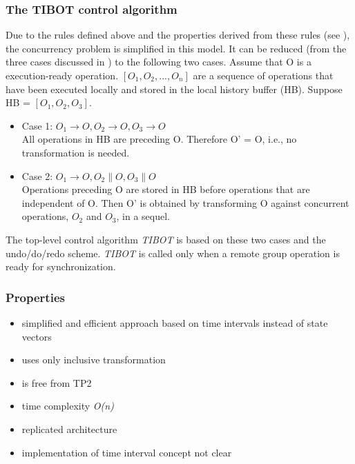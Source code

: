 \subsubsection{The TIBOT control algorithm}
Due to the rules defined above and the properties derived from these rules (see \cite{tibot}), the concurrency problem is simplified in this model. It can be reduced (from the three cases discussed in \cite{sun98b}) to the following two cases. Assume that O is a execution-ready operation. $[O_{1},O_{2},...,O_{n}]$ are a sequence of operations that have been executed locally and stored in the local history buffer (HB). Suppose HB = $[O_{1},O_{2},O_{3}]$.
\begin{itemize}
 \item Case 1: $O_{1} \rightarrow O, O_{2} \rightarrow O, O_{3} \rightarrow O$ \\
 All operations in HB are preceding O. Therefore O' = O, i.e., no transformation is needed.
 \item Case 2: $O_{1} \rightarrow O, O_{2} \parallel O, O_{3} \parallel O$ \\
 Operations preceding O are stored in HB before operations that are independent of O. Then O' is obtained by transforming O against concurrent operations, $O_{2}$ and $O_{3}$, in a sequel.
\end{itemize}

The top-level control algorithm \emph{TIBOT} is based on these two cases and the undo/do/redo scheme. \emph{TIBOT} is called only when a remote group operation is ready for synchronization.


\subsubsection{Properties}
\begin{itemize}
 \item simplified and efficient approach based on time intervals instead of state vectors
 \item uses only inclusive transformation
 \item is free from TP2
 \item time complexity \emph{O(n)}
 \item replicated architecture
 \item implementation of time interval concept not clear
\end{itemize}